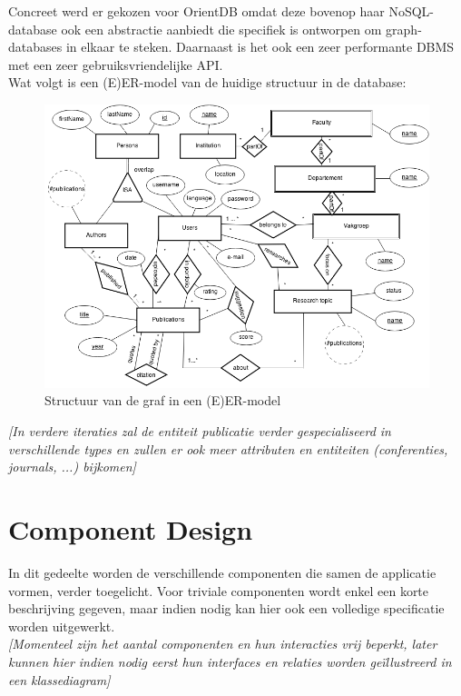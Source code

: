 \documentclass{article}
\begin{document}
Concreet werd er gekozen voor OrientDB omdat deze bovenop haar NoSQL-database ook een abstractie aanbiedt die specifiek is ontworpen om graph-databases in elkaar te steken. Daarnaast is het ook een zeer performante DBMS met een zeer gebruiksvriendelijke API. \\

Wat volgt is een (E)ER-model van de huidige structuur in de database:

\begin{figure}[!h]
\centering
 \includegraphics[width=150mm]{ER-model.png}
 \caption{Structuur van de graf in een (E)ER-model}
 \label{ER-model}
\end{figure}

\textit{[In verdere iteraties zal de entiteit publicatie verder gespecialiseerd in verschillende types en zullen er ook meer attributen en entiteiten (conferenties, journals, ...) bijkomen]}

\clearpage

\section{Component Design}
\label{sec:components}

In dit gedeelte worden de verschillende componenten die samen de applicatie vormen, verder toegelicht. Voor triviale componenten wordt enkel een korte beschrijving gegeven, maar indien nodig kan hier ook een volledige specificatie worden uitgewerkt. \\

\textit{[Momenteel zijn het aantal componenten en hun interacties vrij beperkt, later kunnen hier indien nodig eerst hun interfaces en relaties worden ge\"illustreerd in een klassediagram]}
\end{document}
